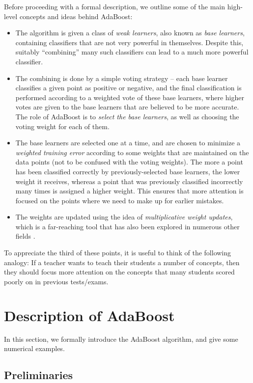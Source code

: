 \documentclass[english]{article}
\begin{document}
Before proceeding with a formal description, we outline some of the main high-level concepts and ideas behind AdaBoost:
\begin{itemize}
    \item The algorithm is given a class of {\em weak learners}, also known as {\em base learners}, containing classifiers that are not very powerful in themselves.  Despite this, suitably ``combining'' many such classifiers can lead to a much more powerful classifier.
    \item The combining is done by a simple voting strategy -- each base learner classifies a given point as positive or negative, and the final classification is performed according to a weighted vote of these base learners, where higher votes are given to the base learners that are believed to be more accurate. The role of AdaBoost is to {\em select the base learners}, as well as choosing the voting weight for each of them.
    \item The base learners are selected one at a time, and are chosen to minimize a {\em weighted training error} according to some weights that are maintained on the data points (not to be confused with the voting weights).  The more a point has been classified correctly by previously-selected base learners, the lower weight it receives, whereas a point that was previously classified incorrectly many times is assigned a higher weight.  This ensures that more attention is focused on the points where we need to make up for earlier mistakes.
    \item The weights are updated using the idea of {\em multiplicative weight updates}, which is a far-reaching tool that has also been explored in numerous other fields \cite{mult_weights}.
\end{itemize}
To appreciate the third of these points, it is useful to think of the following analogy: If a teacher wants to teach their students a number of concepts, then they should focus more attention on the concepts that many students scored poorly on in previous tests/exams.

\section{Description of AdaBoost}

In this section, we formally introduce the AdaBoost algorithm, and give some numerical examples.

\subsection{Preliminaries}
\end{document}
